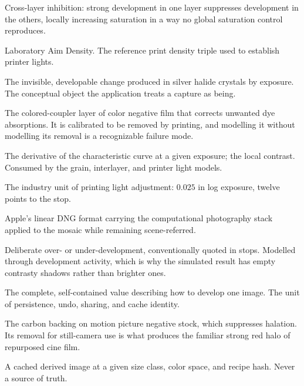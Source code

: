 \begin{description}[leftmargin=0pt,labelindent=0pt,style=nextline,itemsep=2pt]
\item[Inter-image effect] Cross-layer inhibition: strong development in one
layer suppresses development in the others, locally increasing saturation in a
way no global saturation control reproduces.

\item[LAD] Laboratory Aim Density. The reference print density triple used to
establish printer lights.

\item[Latent image] The invisible, developable change produced in silver halide
crystals by exposure. The conceptual object the application treats a capture as
being.

\item[Orange mask] The colored-coupler layer of color negative film that
corrects unwanted dye absorptions. It is calibrated to be removed by printing,
and modelling it without modelling its removal is a recognizable failure mode.

\item[Point gamma] The derivative of the characteristic curve at a given
exposure; the local contrast. Consumed by the grain, interlayer, and printer
light models.

\item[Printer point] The industry unit of printing light adjustment: $0.025$ in
log exposure, twelve points to the stop.

\item[ProRAW] Apple's linear DNG format carrying the computational
photography stack applied to the mosaic while remaining scene-referred.

\item[Push / pull processing] Deliberate over- or under-development,
conventionally quoted in stops. Modelled through development activity, which is
why the simulated result has empty contrasty shadows rather than brighter ones.

\item[Recipe] The complete, self-contained value describing how to develop one
image. The unit of persistence, undo, sharing, and cache identity.

\item[Remjet] The carbon backing on motion picture negative stock, which
suppresses halation. Its removal for still-camera use is what produces the
familiar strong red halo of repurposed cine film.

\item[Rendition] A cached derived image at a given size class, color space, and
recipe hash. Never a source of truth.


\end{description}

